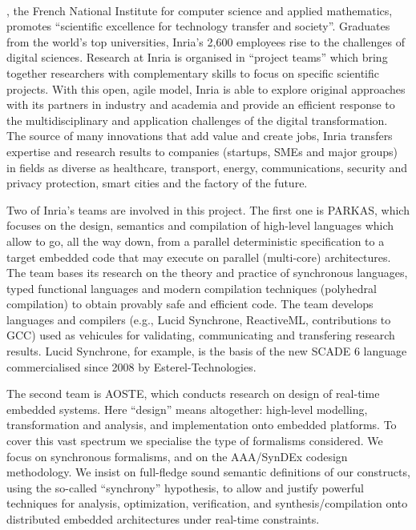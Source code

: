 \documentclass[a4paper,11pt]{article}
\begin{document}
\ 


\INRIA{}, the French National Institute for computer science and applied
mathematics, promotes ``scientific excellence for technology transfer
and society''. Graduates from the world's top universities, Inria's
2,600 employees rise to the challenges of digital sciences. Research
at Inria is organised in ``project teams'' which bring together
researchers with complementary skills to focus on specific scientific
projects. With this open, agile model, Inria is able to explore
original approaches with its partners in industry and academia and
provide an efficient response to the multidisciplinary and application
challenges of the digital transformation. The source of many
innovations that add value and create jobs, Inria transfers expertise
and research results to companies (startups, SMEs and major groups) in
fields as diverse as healthcare, transport, energy, communications,
security and privacy protection, smart cities and the factory of the
future.

Two of Inria's teams are involved in this project. The first one is
PARKAS, which focuses on the design, semantics and compilation of
high-level languages which allow to go, all the way down, from a
parallel deterministic specification to a target embedded code that
may execute on parallel (multi-core) architectures. The team bases its
research on the theory and practice of synchronous languages, typed
functional languages and modern compilation techniques (polyhedral
compilation) to obtain provably safe and efficient code. The team
develops languages and compilers (e.g., Lucid Synchrone, ReactiveML,
contributions to GCC) used as vehicules for validating, communicating
and transfering research results. Lucid Synchrone, for example, is the
basis of the new SCADE 6 language commercialised since 2008 by
Esterel-Technologies.

The second team is AOSTE, which conducts research on design of
real-time embedded systems. Here ``design'' means altogether:
high-level modelling, transformation and analysis, and implementation
onto embedded platforms. To cover this vast spectrum we specialise the
type of formalisms considered. We focus on synchronous formalisms,
and on the AAA/SynDEx codesign methodology. We insist on full-fledge
sound semantic definitions of our constructs, using the so-called
``synchrony'' hypothesis, to allow and justify powerful techniques
for analysis, optimization, verification, and synthesis/compilation
onto distributed embedded architectures under real-time constraints.
\end{document}
